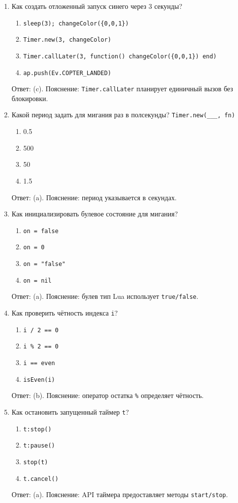 \begin{enumerate}
  \item Как создать отложенный запуск синего через 3 секунды?
  \begin{enumerate}[label=(\alph*)]
    \item \verb|sleep(3); changeColor({0,0,1})| \item \verb|Timer.new(3, changeColor)| \item \verb|Timer.callLater(3, function() changeColor({0,0,1}) end)| \item \verb|ap.push(Ev.COPTER_LANDED)|
  \end{enumerate}
  Ответ: (c). Пояснение: \verb|Timer.callLater| планирует единичный вызов без блокировки.

  \item Какой период задать для мигания раз в полсекунды? \verb|Timer.new(___, fn)|
  \begin{enumerate}[label=(\alph*)]
    \item 0.5 \item 500 \item 50 \item 1.5
  \end{enumerate}
  Ответ: (a). Пояснение: период указывается в секундах.

  \item Как инициализировать булевое состояние для мигания?
  \begin{enumerate}[label=(\alph*)]
    \item \verb|on = false| \item \verb|on = 0| \item \verb|on = "false"| \item \verb|on = nil|
  \end{enumerate}
  Ответ: (a). Пояснение: булев тип Lua использует \verb|true/false|.

  \item Как проверить чётность индекса \verb|i|?
  \begin{enumerate}[label=(\alph*)]
    \item \verb|i / 2 == 0| \item \verb|i % 2 == 0| \item \verb|i == even| \item \verb|isEven(i)|
  \end{enumerate}
  Ответ: (b). Пояснение: оператор остатка \verb|%| определяет чётность.

  \item Как остановить запущенный таймер \verb|t|?
  \begin{enumerate}[label=(\alph*)]
    \item \verb|t:stop()| \item \verb|t:pause()| \item \verb|stop(t)| \item \verb|t.cancel()|
  \end{enumerate}
  Ответ: (a). Пояснение: API таймера предоставляет методы \verb|start/stop|.


\end{enumerate}
